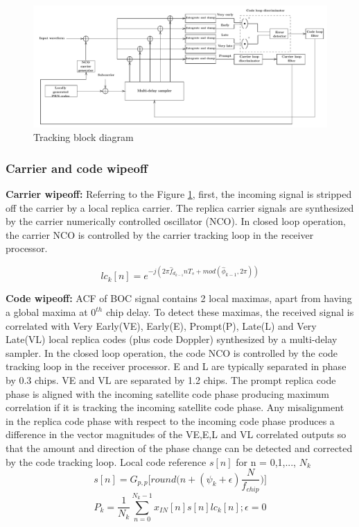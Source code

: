 \documentclass[conference]{IEEEtran}
\begin{document}
\begin{normalsize}
\begin{figure}[ht]
\centering
\includegraphics[width=1.5\columnwidth]{figs/tracking}
\centering
\caption{Tracking block diagram}
\label{fig:tracking}
\end{figure}
\end{normalsize}
\subsubsection{Carrier and code wipeoff}
\textbf{Carrier wipeoff: }Referring to the Figure \ref{fig:tracking}, first, the incoming signal is 
stripped off the carrier by a local replica carrier. The replica carrier signals are synthesized 
by the carrier numerically controlled oscillator (NCO). In closed loop operation, the carrier NCO is controlled 
by the carrier tracking loop in the receiver processor.

\begin{equation}
	lc_k[n] = e^{-j(2\pi \hat{f}_{d_{k-1}}nT_s+ mod(\hat{\phi}_{k-1},2\pi))}
	\label{eq:local_replica}
\end{equation}

\textbf{Code wipeoff: }ACF of BOC signal contains 2 local maximas, apart from having a global maxima at $0^{th}$ chip delay.
To detect these maximas, the received signal is  correlated with Very Early(VE), Early(E), 
Prompt(P), Late(L) and Very Late(VL) local replica codes (plus code Doppler) synthesized by a 
multi-delay sampler. In the closed loop operation, the code NCO is controlled by the code tracking 
loop in the receiver processor. E and L are typically separated in phase by 0.3 chips. VE and VL are
separated by 1.2 chips. The prompt replica code phase is aligned with the 
incoming satellite code phase producing maximum correlation if it is tracking the incoming satellite code 
phase.  Any misalignment in the replica code phase with respect to the incoming code phase produces 
a difference in the vector magnitudes of the VE,E,L and VL correlated outputs so that the amount 
and direction of the phase change can be detected and corrected by the code tracking loop.
Local code reference $s[n]$ for n = 0,1,..., $N_k$
\begin{equation}
	s[n] = G_{p,p}\biggl[ round\biggl( n + (\psi_k + \epsilon)\frac{N}{f_{chip}}\biggr)\biggr]
\end{equation}
\begin{equation}
	P_k = \frac{1}{N_k} \sum_{n=0}^{N_k-1} x_{IN}[n] s[n] lc_k[n] ;  \epsilon = 0
\end{equation}
\end{document}
